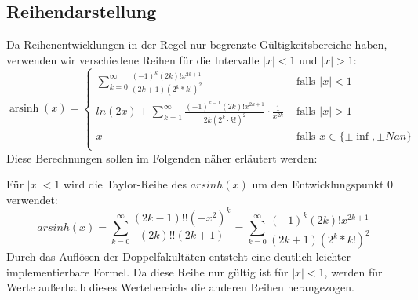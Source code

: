 \documentclass[course=erap] {aspdoc}
\begin{document}
    \subsection{Reihendarstellung}
    Da Reihenentwicklungen in der Regel nur begrenzte Gültigkeitsbereiche haben, verwenden wir verschiedene Reihen für die Intervalle $|x| < 1$ und $|x| > 1$:
      \[ \operatorname{arsinh}(x) =
    \begin{cases}
        \sum_{k = 0}^{\infty} \frac{(-1)^k(2k)!x^{2k + 1}}{(2k + 1)(2^k*k!)^2}     & \text{ falls } |x| < 1 \\
        ln(2x) + \sum_{k = 1}^{\infty} \frac{(-1)^{k - 1}(2k)!x^{2k + 1}}{2k(2^k\cdot k!)^2} \cdot \frac{1}{x^{2k}}  & \text{ falls } |x| >1 \\
        x     & \text{ falls } x \in \{\pm\inf, \pm Nan\}\\
    \end{cases}\]
    Diese Berechnungen sollen im Folgenden näher erläutert werden:
    
    Für $|x| < 1$ wird die Taylor-Reihe des $arsinh(x)$ um den Entwicklungspunkt 0 verwendet:
    \[
        arsinh(x) = \sum_{k = 0}^{\infty} \frac{(2k-1)!!(-x^2)^k}{(2k)!!(2k + 1)}
        = \sum_{k = 0}^{\infty} \frac{(-1)^k(2k)!x^{2k + 1}}{(2k + 1)(2^k*k!)^2}
    \]
    Durch das Auflösen der Doppelfakultäten entsteht eine deutlich leichter implementierbare Formel.
    Da diese Reihe nur gültig ist für $|x| < 1$, werden für Werte außerhalb dieses Wertebereichs die anderen Reihen herangezogen.
\end{document}
